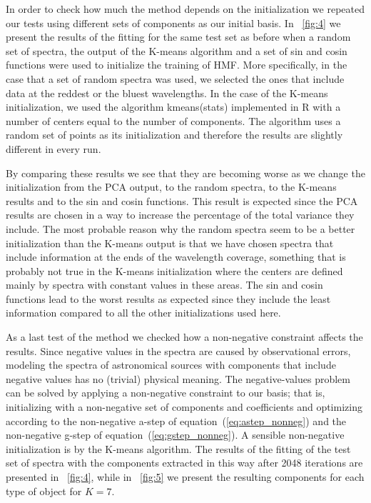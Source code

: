 \documentclass[12pt,preprint]{aastex}
\newcommand{\equationname}{equation}
\begin{document}
In order to check how much the method depends on the initialization we
repeated our tests using different sets of components as our initial
basis. In \figurename~\ref{fig:4} we present the results of the
fitting for the same test set as before when a random set of
spectra, the output of the K-means algorithm and a set of sin and
cosin functions were used to initialize the training of HMF. More specifically, in the
case that a set of random spectra was used, we selected the ones that
include data at the reddest or the bluest wavelengths. In the case of 
the K-means initialization, we used the
algorithm kmeans(stats) implemented in R with a number of centers
equal to the number of components. The algorithm uses a random
set of points as its initialization and therefore the results are
slightly different in every run.

By comparing these results we see that they are becoming worse as we
change the initialization from the PCA output, to the random spectra,
to the K-means results and to the sin and cosin functions. This result
is expected since the PCA results are chosen in a way to increase the
percentage of the total variance they include. The most probable
reason why the random spectra seem to be a better initialization than
the K-means output is that we have chosen spectra that include
information at the ends of the wavelength coverage, something that is
probably not true in the K-means initialization where the centers are
defined mainly by spectra with constant values in these areas. The sin
and cosin functions lead to the worst results as expected since they
include the least information compared to all the other
initializations used here.

As a last test of the method we checked how a non-negative constraint
affects the results. Since negative values in the spectra are caused
by observational errors, modeling the spectra of astronomical sources
with components that include negative values has no (trivial) physical
meaning. The negative-values problem can be solved by applying a non-negative
constraint to our basis; that is,
initializing with a non-negative set of components and coefficients
and optimizing according to the non-negative a-step of
\equationname~(\ref{eq:astep_nonneg}) and the non-negative g-step of
\equationname~(\ref{eq:gstep_nonneg}). A sensible non-negative 
initialization  is by the K-means
algorithm. The results of the fitting of the test set of spectra with
the components extracted in this way after 2048 iterations are
presented in \figurename~\ref{fig:4}, while in \figurename~\ref{fig:5}
we present the resulting components for each type of object for $K=7$.
\end{document}
